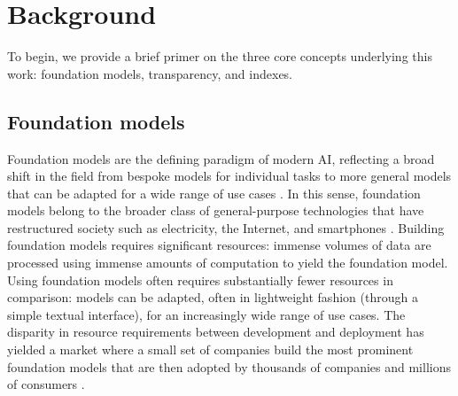 \hypertarget{background}{\section{Background}}
\label{sec:background}
To begin, we provide a brief primer on the three core concepts underlying this work: foundation models, transparency, and indexes. 

\hypertarget{fms}{\subsection{Foundation models}}
\label{sec:background-fms}
Foundation models are the defining paradigm of modern AI, 
reflecting a broad shift in the field from bespoke models for individual tasks to more general models that can be adapted for a wide range of use cases \cite{bommasani2021opportunities}.
In this sense, foundation models belong to the broader class of general-purpose technologies that have restructured society such as electricity, the Internet, and smartphones \citep{bresnahan1995gpt, brynjolfsson2021jcurve, bommasani2021opportunities, eloundou2023gpts}. Building foundation models requires significant resources: immense volumes of data are processed using immense amounts of computation to yield the foundation model.
Using foundation models often requires substantially fewer resources in comparison: models can be adapted, often in lightweight fashion (\eg through a simple textual interface), for an increasingly wide range of use cases.
The disparity in resource requirements between development and deployment has yielded a market where a small set of companies build the most prominent foundation models that are then adopted by thousands of companies and millions of consumers \citep{bommasani2023ecosystem, vipra2023concentration, widder2023open}. 

